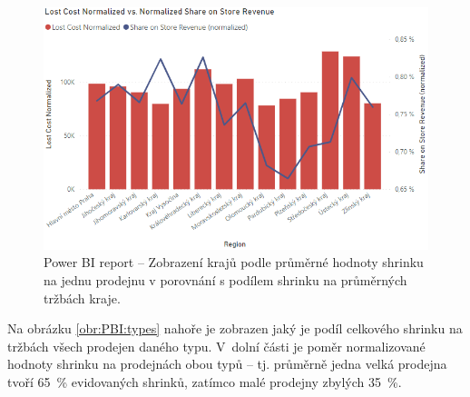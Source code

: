 \begin{figure}[h!]
    \centering
    \captionsetup{justification=centering}
    \includegraphics[width=\textwidth]{obrazky/PBI/normalized.png}
    \caption{Power BI report -- Zobrazení krajů podle průměrné hodnoty shrinku \\ na jednu prodejnu v porovnání s podílem shrinku na průměrných tržbách kraje.}
    \label{obr:PBI:norm}
\end{figure}


Na obrázku \ref*{obr:PBI:types} nahoře je zobrazen jaký je podíl celkového shrinku na tržbách všech prodejen daného typu. V~dolní části je poměr normalizované hodnoty shrinku na prodejnách obou typů -- tj. průměrně jedna velká prodejna  tvoří 65~\% evidovaných shrinků, zatímco malé prodejny zbylých 35~\%.

